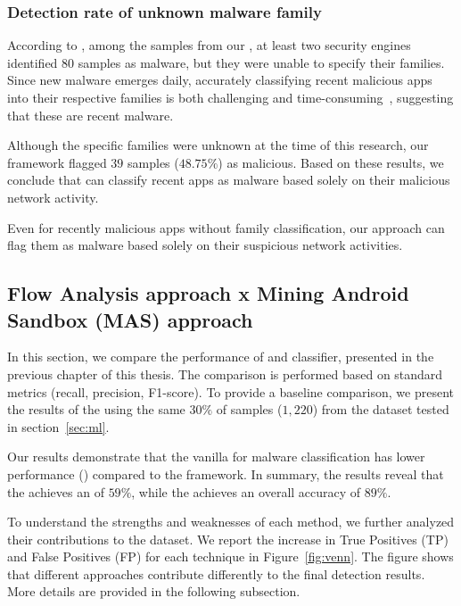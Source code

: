 \subsubsection{Detection rate of unknown malware family}\label{sec:unknowfamily}

According to \vt, among the samples from our \fds, at least two security engines identified $80$ samples as malware, but they were unable to specify their families. Since new malware emerges daily, accurately classifying recent malicious apps into their respective families is both challenging and time-consuming~\cite{DBLP:journals/compsec/WangTW21,DBLP:journals/compsec/ContiKP22}, suggesting that these are recent malware.

Although the specific families were unknown at the time of this research, our framework flagged $39$ samples ($48.75\%$) as malicious. Based on these results, we conclude that \droidxpflow can classify recent apps as malware based solely on their malicious network activity.

\begin{finding}

Even for recently malicious apps without family classification, our approach can flag them as malware based solely on their suspicious network activities.

\end{finding}



\subsection{Flow Analysis approach x Mining Android Sandbox (MAS) approach}\label{sec:new-mas-approach}


In this section, we compare the performance of \droidxpflow and \mas classifier, presented in the previous chapter of this thesis. The comparison is performed based on standard metrics (recall, precision, F1-score). To provide a baseline comparison, we present the results of the \mas using the same $30\%$ of samples ($1,220$) from the \fds dataset tested in section~\ref{sec:ml}.

Our results demonstrate that the vanilla \mas for malware classification has lower performance (\fone) compared to the \droidxpflow framework. In summary, the results reveal that the \mas achieves an \fone of $59\%$, while the \droidxpflow achieves an overall accuracy of $89\%$.

To understand the strengths and weaknesses of each method, we further analyzed their contributions to the \fds dataset. We report the increase in True Positives (TP) and False Positives (FP) for each technique in Figure~\ref{fig:venn}. The figure shows that different approaches contribute differently to the final detection results. More details are provided in the following subsection.


